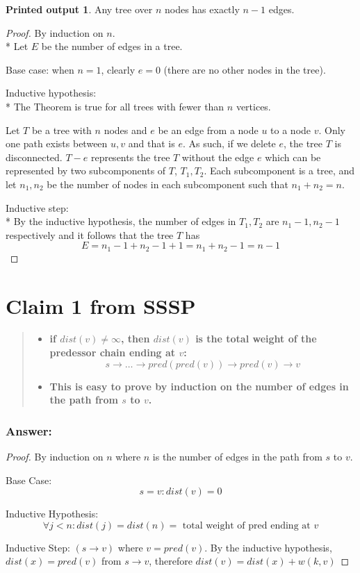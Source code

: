 \documentclass[titlepage]{article}
\theoremstyle{definition}
\newtheorem{name}{Printed output}
\begin{document}
\newtheorem{mydef}{Theorem}

\begin{name}
  Any tree over $n$ nodes has exactly $n-1$ edges.
\end{name}


\begin{proof}
By induction on $n$. \\*
Let $E$ be the number of edges in a tree.

Base case: when $n =1$, clearly $e = 0$ (there are no other nodes in the tree).

Inductive hypothesis: \\*
The Theorem is true for all trees with fewer than $ n$ vertices.

Let $T$ be a tree with $n$ nodes and $e$ be an edge from a node $u$ to a node
$v$. Only one path exists between $u,v$ and that is $e$. As such, if we delete $e$, the
tree $T$ is disconnected. $T - e$ represents the tree $T$ without the edge $e$
which can be represented by two subcomponents of $T$, $T_1, T_2$. Each
subcomponent is a tree, and let $n_1,n_2$ be the number of nodes in each
subcomponent such that $n_1 + n_2 = n$. 

Inductive step: \\*
By the inductive hypothesis, the number of edges in $T_1, T_2$ are $n_1-1,
n_2-1$
respectively and it follows that the tree $T$ has 
\[ E = n_1 -1 + n_2 -1 +1 = n_1 + n_2-1 = n-1 \]
  \qedhere
\end{proof}


\section{Claim 1 from SSSP}
  \begin{quote}
  \begin{itemize}
    \item \textbf{if $dist(v) \neq \infty $, then $dist(v)$ is the total weight
    of the predessor chain ending at $v$:
    \[ s \rightarrow \dots \rightarrow pred(pred(v)) \rightarrow pred(v) \rightarrow v \] }
    \item \textbf{This is easy to prove by induction on the number of edges in
    the path from $s$ to $v$.}
  \end{itemize}
  \end{quote}

  \subsubsection{Answer:}
    \begin{proof}
      By induction on $n$ where $n$ is the number of edges in the path from
      $s$ to $v$. 

      Base Case: 
      \[ s = v: dist(v) = 0 \]

      Inductive Hypothesis:
      \[ \forall j < n: dist(j) = dist(n) = \text{ total weight of pred ending at } v \]

      Inductive Step:
      $(s \rightarrow v)$ where $v = pred(v)$. By the inductive hypothesis,
      $dist(x) = pred(v)$ from $s \rightarrow v$, therefore $dist(v) = dist(x) +
      w(k,v)$
    \end{proof}
\end{document}
